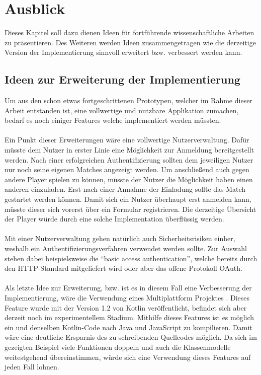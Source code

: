 
\chapter{Ausblick}
Dieses Kapitel soll dazu dienen Ideen für fortführende wissenschaftliche Arbeiten zu präsentieren. Des Weiteren werden Ideen zusammengetragen wie die derzeitige Version der Implementierung sinnvoll erweitert bzw. verbessert werden kann.

\section{Ideen zur Erweiterung der Implementierung}
Um aus den schon etwas fortgeschrittenen Prototypen, welcher im Rahme dieser Arbeit entstanden ist, eine vollwertige und nutzbare Applikation zumachen, bedarf es noch einiger Features welche implementiert werden müssten.\\
\\
Ein Punkt dieser Erweiterungen wäre eine vollwertige Nutzerverwaltung. Dafür müsste dem Nutzer in erster Linie eine Möglichkeit zur Anmeldung bereitgestellt werden. Nach einer erfolgreichen Authentifizierung sollten dem jeweiligen Nutzer nur noch seine eigenen Matches angezeigt werden.
Um anschließend auch gegen andere Player spielen zu können, müsste der Nutzer die Möglichkeit haben einen anderen einzuladen. Erst nach einer Annahme der Einladung sollte das Match gestartet werden können. Damit sich ein Nutzer überhaupt erst anmelden kann, müsste dieser sich vorerst über ein Formular registrieren. Die derzeitige Übersicht der Player würde durch eine solche Implementation überflüssig werden.\\
\\
Mit einer Nutzerverwaltung gehen natürlich auch Sicherheitsrisiken einher, weshalb ein Authentifizierungsverfahren verwendet werden sollte. Zur Auswahl stehen dabei beispielsweise die \enquote{basic access authentication}, welche bereits durch den \gls{HTTP}-Standard mitgeliefert wird oder aber das offene Protokoll \gls{OAuth}.\\
\\
Als letzte Idee zur Erweiterung, bzw. ist es in diesem Fall eine Verbesserung der Implementierung, wäre die Verwendung eines Multiplattform Projektes \cite{kotlinMultiPlattform}. Dieses Feature wurde mit der Version 1.2 von Kotlin veröffentlicht, befindet sich aber derzeit noch im experimentellem Stadium. Mithilfe dieses Features ist es möglich ein und denselben Kotlin-Code nach Java und JavaScript zu kompilieren. Damit wäre eine deutliche Ersparnis des zu schreibenden Quellcodes möglich. Da sich im gezeigten Beispiel viele Funktionen doppeln und auch die Klassenmodelle weitestgehend übereinstimmen, würde sich eine Verwendung dieses Features auf jeden Fall lohnen.

